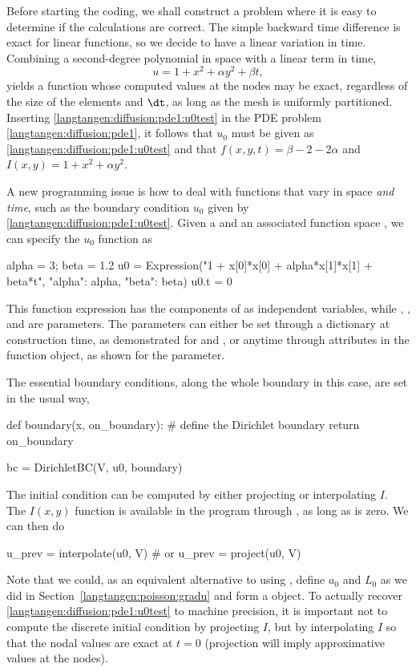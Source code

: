 Before starting the coding, we shall construct a problem where it is
easy to determine if the calculations are correct. The simple backward
time difference is exact for linear functions, so we decide to have
a linear variation in time. Combining a second-degree polynomial in space
with a linear term in time,
\begin{equation} u = 1 + x^2 + \alpha y^2 + \beta t,
\label{langtangen:diffusion:pde1:u0test}
\end{equation}
yields a function whose computed values at the nodes may be exact,
regardless of the size of the elements and ${\dt}$, as long as the
mesh is uniformly partitioned.
Inserting \eqref{langtangen:diffusion:pde1:u0test} in the PDE problem
\eqref{langtangen:diffusion:pde1}, it follows that $u_0$ must be given as
\eqref{langtangen:diffusion:pde1:u0test} and that $f(x,y,t)=\beta - 2 - 2\alpha$
and $I(x,y)=1+x^2+\alpha y^2$.


A new programming issue is
how to deal with functions that vary in space \emph{and time}, such as
the boundary condition $u_0$ given by \eqref{langtangen:diffusion:pde1:u0test}.
Given a  and an associated function space , we
can specify the $u_0$ function as
\begin{python}
alpha = 3; beta = 1.2
u0 = Expression("1 + x[0]*x[0] + alpha*x[1]*x[1] + beta*t",
                {"alpha": alpha, "beta": beta})
u0.t = 0
\end{python}
This function expression has the components of  as independent
variables, while , , and  are parameters.
The parameters can either be set through a dictionary at construction
time, as demonstrated for  and , or anytime
through attributes in the function object, as shown for the 
parameter.

The essential boundary conditions, along the whole boundary in this case,
are set in the usual way,
\begin{python}
def boundary(x, on_boundary):  # define the Dirichlet boundary
    return on_boundary

bc = DirichletBC(V, u0, boundary)
\end{python}

The initial condition can be computed by either projecting or interpolating
$I$. The $I(x,y)$ function is available in the program through
,
as long as  is zero.
We can then do
\begin{python}
u_prev = interpolate(u0, V)
# or
u_prev = project(u0, V)
\end{python}
Note that we could, as an equivalent alternative to using , define
$a_0$ and $L_0$ as we did in Section~\ref{langtangen:poisson:gradu} and form
a  object.
To actually recover \eqref{langtangen:diffusion:pde1:u0test} to machine
precision, it is important not to compute the discrete initial condition by
projecting $I$, but by interpolating $I$ so that the nodal values are
exact at $t=0$ (projection will imply approximative values at the nodes).


